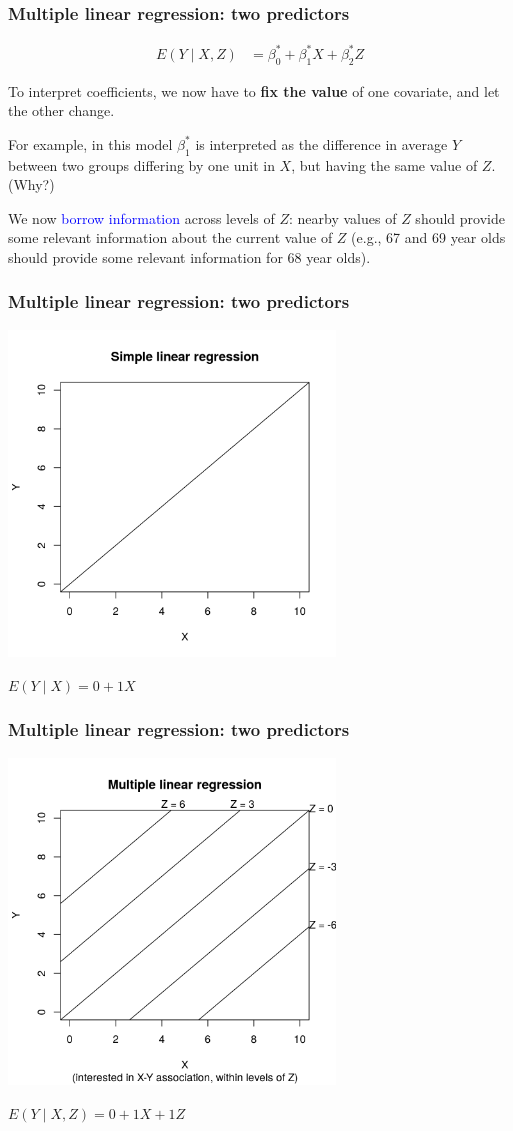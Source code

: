 \documentclass[12pt, 
hyperref={colorlinks=true, linkcolor=blue, urlcolor=cyan},dvipsnames]{beamer}
\begin{document}
\begin{frame}
\frametitle{Multiple linear regression: two predictors}
\begin{align*}
E(Y \mid X, Z) &= \beta_0^* + \beta_1^* X + \beta_2^* Z
\end{align*}

To interpret coefficients, we now have to \textbf{fix the value} of one covariate, and let the other change.

For example, in this model $\beta_1^*$ is interpreted as the difference in average $Y$ between two groups differing by one unit in $X$, but having the same value of $Z$. (Why?)

We now \textcolor{blue}{borrow information} across levels of $Z$: nearby values of $Z$ should provide some relevant information about the current value of $Z$ (e.g., 67 and 69 year olds should provide some relevant information for 68 year olds).

\end{frame}

\begin{frame}
\frametitle{Multiple linear regression: two predictors}
\centering
\includegraphics[width = 0.65\textwidth]{plots/simple_line.png}

$E(Y \mid X) = 0 + 1 X$
\end{frame}

\begin{frame}
\frametitle{Multiple linear regression: two predictors}
\centering
\includegraphics[width = 0.65\textwidth]{plots/multiple_line.png}

$E(Y \mid X, Z) = 0 + 1 X + 1 Z$
\end{frame}
\end{document}
